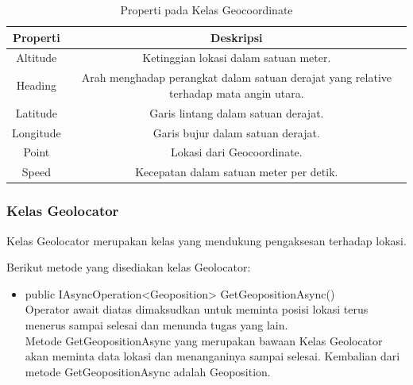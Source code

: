 \begin{table}[h]
	\centering
		\begin{tabular}{ |c||c|}
				\hline
				Properti & Deskripsi \\ \hline
				Altitude & Ketinggian lokasi dalam satuan meter. \\ \hline
				Heading & Arah menghadap perangkat dalam satuan derajat yang relative terhadap mata angin utara. \\ \hline
				Latitude & Garis lintang dalam satuan derajat. \\ \hline
				Longitude  & Garis bujur dalam satuan derajat. \\ \hline
				Point & Lokasi dari Geocoordinate. \\ \hline
				Speed & Kecepatan dalam satuan meter per detik. \\ \hline
				\hline
		\end{tabular}
	\caption{Properti pada Kelas Geocoordinate}
	\label{tab:PropertiPadaKelasGeocoordinate}
\end{table} 

\subsubsection{Kelas Geolocator}
\label{subsubsec:Kelas Geolocator}
\hspace{0.5cm} Kelas Geolocator merupakan kelas yang mendukung pengaksesan terhadap lokasi.

Berikut metode yang disediakan kelas Geolocator:
\begin{itemize}
	\item public IAsyncOperation<Geoposition> GetGeopositionAsync() \\
		Operator await diatas dimaksudkan untuk meminta posisi lokasi terus menerus sampai selesai dan menunda tugas yang lain. \\
		Metode GetGeopositionAsync yang merupakan bawaan Kelas Geolocator akan meminta data lokasi dan menanganinya sampai selesai.
		Kembalian dari metode GetGeopositionAsync adalah Geoposition.
\end{itemize}

